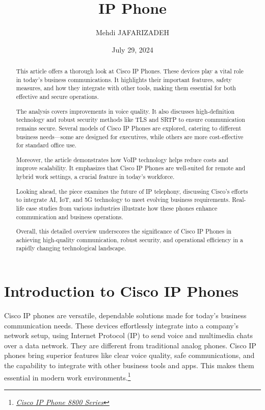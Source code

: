 \documentclass[11pt,a4paper]{article}
\title{IP Phone}
\author{Mehdi JAFARIZADEH}
\date{July 29, 2024}
\begin{document}
\maketitle

\begin{abstract}
  This article offers a thorough look at Cisco IP Phones. These devices play a vital role in today's business communications. It highlights their important features, safety measures, and how they integrate with other tools, making them essential for both effective and secure operations.

  The analysis covers improvements in voice quality. It also discusses high-definition technology and robust security methods like TLS and SRTP to ensure communication remains secure. Several models of Cisco IP Phones are explored, catering to different business needs—some are designed for executives, while others are more cost-effective for standard office use.

  Moreover, the article demonstrates how VoIP technology helps reduce costs and improve scalability. It emphasizes that Cisco IP Phones are well-suited for remote and hybrid work settings, a crucial feature in today's workforce.

  Looking ahead, the piece examines the future of IP telephony, discussing Cisco’s efforts to integrate AI, IoT, and 5G technology to meet evolving business requirements. Real-life case studies from various industries illustrate how these phones enhance communication and business operations.

Overall, this detailed overview underscores the significance of Cisco IP Phones in achieving high-quality communication, robust security, and operational efficiency in a rapidly changing technological landscape.
\end{abstract}
\section*{Introduction to Cisco IP Phones}
Cisco IP phones are versatile, dependable solutions made for today’s business communication needs. These devices effortlessly integrate into a company’s network setup, using Internet Protocol (IP) to send voice and multimedia chats over a data network. They are different from traditional analog phones. Cisco IP phones bring superior features like clear voice quality, safe communications, and the capability to integrate with other business tools and apps. This makes them essential in modern work environments.\footnote{\label{foot:Cisco IP Phone 8800}\href{https://www.cisco.com/c/en/us/products/collaboration-endpoints/unified-ip-phone-8800-series/index.html}{\textit{Cisco IP Phone 8800 Series}}}
\end{document}
